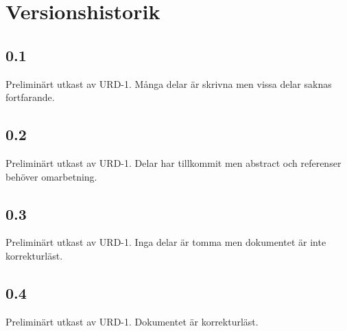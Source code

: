 \section*{Versionshistorik}

\subsection*{0.1}
Preliminärt utkast av URD-1. Många delar är skrivna men vissa delar saknas fortfarande.

\subsection*{0.2}
Preliminärt utkast av URD-1. Delar har tillkommit men abstract och referenser behöver omarbetning.

\subsection*{0.3}
Preliminärt utkast av URD-1. Inga delar är tomma men dokumentet är inte korrekturläst.

\subsection*{0.4}
Preliminärt utkast av URD-1. Dokumentet är korrekturläst.